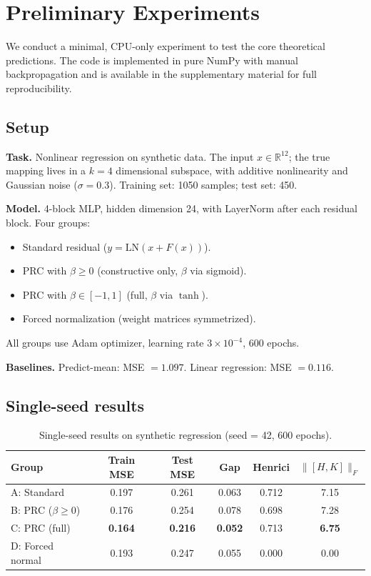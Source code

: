 \documentclass[11pt,a4paper]{article}
\theoremstyle{definition}
\begin{document}
\section{Preliminary Experiments}
\label{sec:prelim}

We conduct a minimal, CPU-only experiment to test the core theoretical
predictions. The code is implemented in pure NumPy with manual backpropagation
and is available in the supplementary material for full reproducibility.

\subsection{Setup}

\textbf{Task.} Nonlinear regression on synthetic data. The input
$x \in \mathbb{R}^{12}$; the true mapping lives in a $k=4$ dimensional
subspace, with additive nonlinearity and Gaussian noise ($\sigma = 0.3$).
Training set: 1050 samples; test set: 450.

\textbf{Model.} 4-block MLP, hidden dimension 24, with LayerNorm after
each residual block. Four groups:
\begin{itemize}[nosep]
  \item[\textbf{A}:] Standard residual ($y = \mathrm{LN}(x + F(x))$).
  \item[\textbf{B}:] PRC with $\beta \geq 0$ (constructive only, $\beta$ via sigmoid).
  \item[\textbf{C}:] PRC with $\beta \in [-1,1]$ (full, $\beta$ via $\tanh$).
  \item[\textbf{D}:] Forced normalization (weight matrices symmetrized).
\end{itemize}
All groups use Adam optimizer, learning rate $3 \times 10^{-4}$, 600 epochs.

\textbf{Baselines.} Predict-mean: MSE $= 1.097$.
Linear regression: MSE $= 0.116$.

\subsection{Single-seed results}

\begin{table}[h]
\centering
\caption{Single-seed results on synthetic regression (seed = 42, 600 epochs).}
\label{tab:results-single}
\begin{tabular}{@{}lccccc@{}}
\toprule
Group & Train MSE & Test MSE & Gap & Henrici & $\|[H,K]\|_F$ \\
\midrule
A: Standard       & 0.197 & 0.261 & 0.063 & 0.712 & 7.15 \\
B: PRC ($\beta \geq 0$) & 0.176 & 0.254 & 0.078 & 0.698 & 7.28 \\
C: PRC (full)     & \textbf{0.164} & \textbf{0.216} & \textbf{0.052} & 0.713 & \textbf{6.75} \\
D: Forced normal  & 0.193 & 0.247 & 0.055 & 0.000 & 0.00 \\
\bottomrule
\end{tabular}
\end{table}
\end{document}
